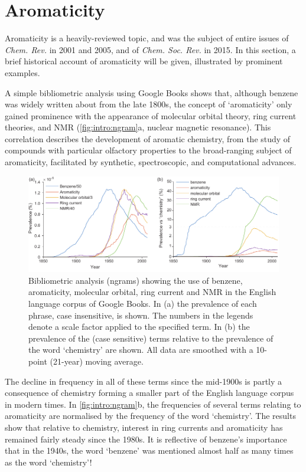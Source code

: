 \FloatBarrier

\section{Aromaticity}
	Aromaticity is a heavily-reviewed topic, and was the subject of entire issues of \textit{Chem. Rev.} in 2001 and 2005,\autocite{Schleyer2001,Schleyer2005} and of \textit{Chem. Soc. Rev.} in 2015.\autocite{Martin2015} In this section, a brief historical account of aromaticity will be given, illustrated by prominent examples. 

	A simple bibliometric analysis using Google Books\autocite{Michel2011} shows that, although benzene was widely written about from the late 1800s, the concept of `aromaticity' only gained prominence with the appearance of molecular orbital theory, ring current theories, and NMR (\autoref{fig:intro:ngram}a, nuclear magnetic resonance). This correlation describes the development of aromatic chemistry, from the study of compounds with particular olfactory properties to the broad-ranging subject of aromaticity, facilitated by synthetic, spectroscopic, and computational advances. 

		\begin{figure}[ht!]
			\centering\includegraphics{figures/intro/ngram.pdf} 
			\caption[]{Bibliometric analysis (ngrams)\autocite{Michel2011} showing the use of benzene, aromaticity, molecular orbital, ring current and NMR in the English language corpus of Google Books.\autocite{Michel2011} In (a) the prevalence of each phrase, case insensitive, is shown. The numbers in the legends denote a scale factor applied to the specified term. In (b) the prevalence of the (case sensitive) terms relative to the prevalence of the word `chemistry' are shown. All data are smoothed with a 10-point (21-year) moving average.}
			\label{fig:intro:ngram}
		\end{figure}

	The decline in frequency in all of these terms since the mid-1900s is partly a consequence of chemistry forming a smaller part of the English language corpus in modern times. In \autoref{fig:intro:ngram}b, the frequencies of several terms relating to aromaticity are normalised by the frequency of the word `chemistry'. The results show that relative to chemistry, interest in ring currents and aromaticity has remained fairly steady since the 1980s. It is reflective of benzene's importance that in the 1940s, the word `benzene' was mentioned almost half as many times as the word `chemistry'!

